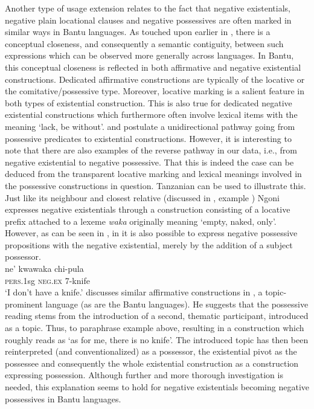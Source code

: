 \documentclass[output=paper]{langsci/langscibook}
\begin{document}
Another type of usage extension relates to the fact that negative
existentials, negative plain locational clauses and negative possessives
are often marked in similar ways in Bantu languages. As touched upon
earlier in , there is a conceptual closeness, and
consequently a semantic contiguity, between such expressions which can be
observed more generally across languages. In Bantu, this conceptual
closeness is reflected in both affirmative and negative existential
constructions. Dedicated affirmative constructions are typically of the
locative or the comitative\slash possessive type. Moreover, locative marking is a
salient feature in both types of existential construction. This is also
true for dedicated negative existential constructions which furthermore
often involve lexical items with the meaning `lack, be without'.
\citet{Heine1997} and \citet[241--242]{HeineKuteva2002} postulate a
unidirectional pathway going from possessive predicates to existential
constructions. However, it is interesting to note that there are also
examples of the reverse pathway in our data, i.e., from negative
existential to negative possessive. That this is indeed the case can be
deduced from the transparent locative marking and lexical meanings involved
in the possessive constructions in question. Tanzanian  can be
used to illustrate this. Just like its neighbour and closest relative
 (discussed in , example
) Ngoni expresses negative existentials through a
construction consisting of a locative prefix attached to a lexeme
\textit{waka} originally meaning `empty, naked, only'. However, as can be
seen in , in  it is also possible to express
negative possessive propositions with the negative existential, merely by
the addition of a subject possessor.
%
\ea\label{ex:ngoni-knife} \\ \gll ne' kwawaka chi-pula\\ \textsc{pers}.1sg
\textsc{neg.ex} 7-knife\\ \glt 	`I don't have a knife.' \z
%
\citet{Koch2012} discusses similar affirmative constructions in
, a to\-pic-pro\-mi\-nent language (as are the Bantu
languages). He suggests that the possessive reading stems from the
introduction of a second, thematic participant, introduced as a topic.
Thus, to paraphrase example  above, resulting in a
construction which roughly reads as `as for me, there is no knife'. The
introduced topic has then been reinterpreted (and conventionalized) as a
possessor, the existential pivot as the possessee and consequently the
whole existential construction as a construction expressing possession.
Although further and more thorough investigation is needed, this
explanation seems to hold for negative existentials becoming negative
possessives in Bantu languages.
\end{document}
